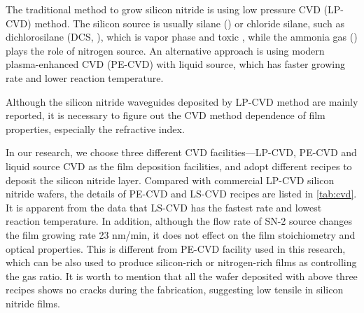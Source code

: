 The traditional method to grow silicon nitride is using low pressure CVD (LP-CVD) method. The silicon source is usually silane () or chloride silane, such as dichlorosilane (DCS, ), which is vapor phase and toxic \cite{Kaloyeros2017}, while the ammonia gas () plays the role of nitrogen source. An alternative approach is using modern plasma-enhanced CVD (PE-CVD) with liquid source, which has faster growing rate and lower reaction temperature.

Although the silicon nitride waveguides deposited by LP-CVD method are mainly reported, it is necessary to figure out the CVD method dependence of film properties, especially the refractive index. 


In our research, we choose three different CVD facilities---LP-CVD, PE-CVD and liquid source CVD as the film deposition facilities, and adopt different recipes to deposit the silicon nitride layer. Compared with commercial LP-CVD silicon nitride wafers,
the details of PE-CVD and LS-CVD recipes are listed in \autoref{tab:cvd}. It is apparent from the data that LS-CVD has the fastest rate and lowest reaction temperature. In addition, although the flow rate of SN-2 source changes the film growing rate 23 nm/min, it does not effect on the film stoichiometry and optical properties. This is different from PE-CVD facility used in this research, which can be also used to produce silicon-rich or nitrogen-rich films as controlling the gas ratio.
It is worth to mention that all the wafer deposited with above three recipes shows no cracks during the fabrication, suggesting low tensile in silicon nitride films.

